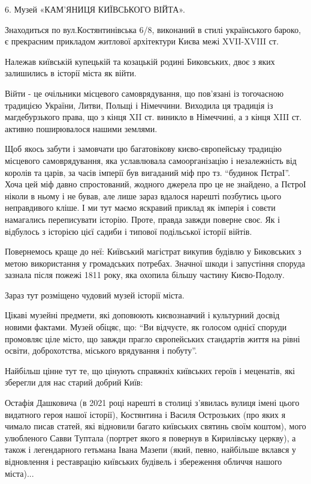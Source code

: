 6. Музей «КАМ’ЯНИЦЯ КИЇВСЬКОГО ВІЙТА».

Знаходиться по вул.Костянтинівська 6/8, виконаний в стилі українського бароко,
є прекрасним прикладом житлової архітектури Києва межі XVII-XVIII ст.

Належав київській купецькій та козацькій родині Биковських, двоє з яких
залишились в історії міста як війти. 

Війти - це очільники місцевого самоврядування, що пов’язані із тогочасною
традицією України, Литви, Польщі і Німеччини. Виходила ця традиція із
магдебурзького права, що з кінця XII ст. виникло в Німеччині, а з кінця XIII
ст. активно поширювалося нашими землями.

Щоб якось забути і замовчати цю багатовікову києво-європейську традицію
місцевого самоврядування, яка уславлювала самоорганізацію і незалежність від
королів та царів, за часів імперії був вигаданий міф про тз. “будинок ПєтраІ”.
Хоча цей міф давно спростований, жодного джерела про це не знайдено, а ПєтроІ
ніколи в ньому і не бував, але лише зараз вдалося нарешті позбутись цього
неправдивого кліше. І ми тут маємо яскравий приклад як імперія і совєти
намагались переписувати історію. Проте, правда завжди поверне своє. Як і
відбулось з історією цієї садиби і типової подільської історії війтів. 

Повернемось краще до неї: Київський магістрат викупив будівлю у Биковських з
метою використання у громадських потребах. Значної шкоди і запустіння споруда
зазнала після пожежі 1811 року, яка охопила більшу частину Києво-Подолу.  

Зараз тут розміщено чудовий музей історії міста. 

Цікаві музейні предмети, які доповюють києвознавчий і культурний досвід новими
фактами. Музей обіцяє, що: \enquote{Ви відчуєте, як голосом однієї споруди промовляє
ціле місто, що завжди прагло європейських стандартів життя на рівні освіти,
доброхотства, міського врядування і побуту}. 

Найбільш цінне тут те, що цінують справжніх київських героїв і меценатів, які
зберегли для нас старий добрий Київ: 

Остафія Дашковича (в 2021 році нарешті в столиці з’явилась вулиця імені цього
видатного героя нашої історії), Костянтина і Василя Острозьких (про яких я
чимало писав статей, які відновили багато київських святинь своїм коштом), мого
улюбленого Савви Туптала (портрет якого я повернув в Кирилівську церкву), а
також і легендарного гетьмана Івана Мазепи (який, певно, найбільше вклався у
відновлення і реставрацію київських будівель і збереження обличчя нашого
міста)...

